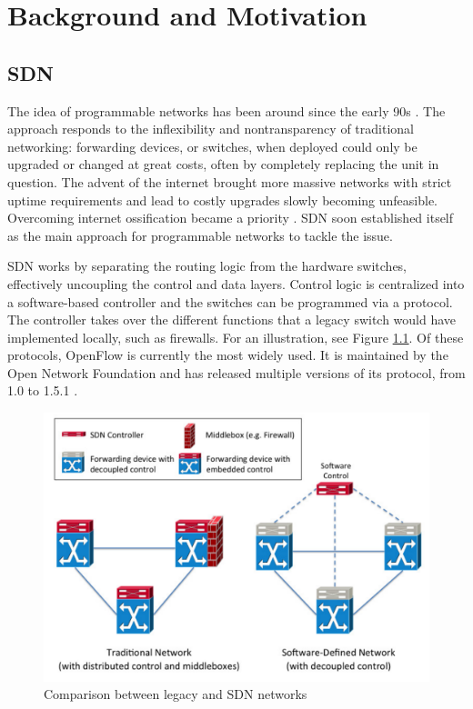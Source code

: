 \chapter{Background and Motivation}

\section{SDN}
The idea of programmable networks has been around since the early 90s \cite{Campbell1999}. The approach responds to the inflexibility and nontransparency of traditional networking: forwarding devices, or switches, when deployed could only be upgraded or changed at great costs, often by completely replacing the unit in question. The advent of the internet brought more massive networks with strict uptime requirements and lead to costly upgrades slowly becoming unfeasible. Overcoming internet ossification became a priority \cite{Anderson2005}. SDN soon established itself as the main approach for programmable networks to tackle the issue.

SDN works by separating the routing logic from the hardware switches, effectively uncoupling the control and data layers. Control logic is centralized into a software-based controller and the switches can be programmed via a protocol. The controller takes over the different functions that a legacy switch would have implemented locally, such as firewalls. For an illustration, see Figure \ref{fig:SDN_Explanation}. Of these protocols, OpenFlow is currently the most widely used.  It is maintained by the Open Network Foundation and has released multiple versions of its protocol, from 1.0 \cite{OpenNetworkingFoundation2009} to 1.5.1 \cite{OpenNetworkingFoundation2015}.

\begin{figure}[h!]
  \centering
  \includegraphics[scale=0.25]{SDN_Explanation.png}
  \caption{Comparison between legacy and SDN networks \cite{Nunes2014}}
  \label{fig:SDN_Explanation}
\end{figure}

